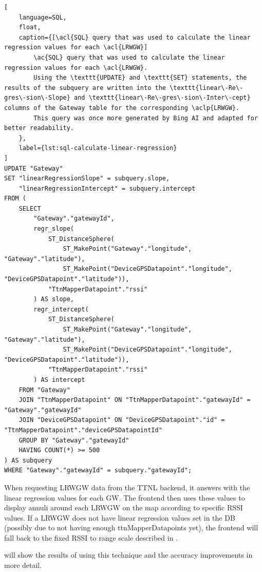 \begin{lstlisting}[
    language=SQL,
    float,
    caption={[\acl{SQL} query that was used to calculate the linear regression values for each \acl{LRWGW}]
        \ac{SQL} query that was used to calculate the linear regression values for each \acl{LRWGW}.
        Using the \texttt{UPDATE} and \texttt{SET} statements, the results of the subquery are written into the \texttt{linear\-Re\-gres\-sion\-Slope} and \texttt{linear\-Re\-gres\-sion\-Inter\-cept} columns of the Gateway table for the corresponding \aclp{LRWGW}.
        This query was once more generated by Bing AI and adapted for better readability.
    },
    label={lst:sql-calculate-linear-regression}
]
UPDATE "Gateway"
SET "linearRegressionSlope" = subquery.slope,
    "linearRegressionIntercept" = subquery.intercept
FROM (
    SELECT
        "Gateway"."gatewayId",
        regr_slope(
            ST_DistanceSphere(
                ST_MakePoint("Gateway"."longitude", "Gateway"."latitude"),
                ST_MakePoint("DeviceGPSDatapoint"."longitude", "DeviceGPSDatapoint"."latitude")),
            "TtnMapperDatapoint"."rssi"
        ) AS slope,
        regr_intercept(
            ST_DistanceSphere(
                ST_MakePoint("Gateway"."longitude", "Gateway"."latitude"),
                ST_MakePoint("DeviceGPSDatapoint"."longitude", "DeviceGPSDatapoint"."latitude")),
            "TtnMapperDatapoint"."rssi"
        ) AS intercept
    FROM "Gateway"
    JOIN "TtnMapperDatapoint" ON "TtnMapperDatapoint"."gatewayId" = "Gateway"."gatewayId"
    JOIN "DeviceGPSDatapoint" ON "DeviceGPSDatapoint"."id" = "TtnMapperDatapoint"."deviceGPSDatapointId"
    GROUP BY "Gateway"."gatewayId"
    HAVING COUNT(*) >= 500
) AS subquery
WHERE "Gateway"."gatewayId" = subquery."gatewayId";
\end{lstlisting}

When requesting \acl{LRWGW} data from the \ac{TTNL} backend, it answers with the linear regression values for each \acl{GW}.
The frontend then uses these values to display annuli around each \acl{LRWGW} on the map according to specific \ac{RSSI} values.
If a \acl{LRWGW} does not have linear regression values set in the \ac{DB} (possibly due to not having enough ttnMapperDatapoints yet), the frontend will fall back to the fixed \ac{RSSI} to range scale described in .

 will show the results of using this technique and the accuracy improvements in more detail.

